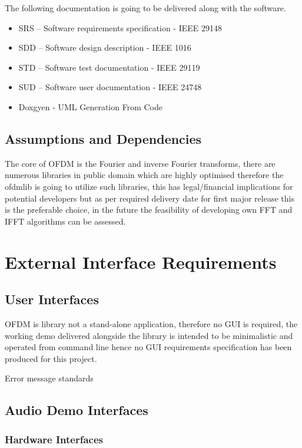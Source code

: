 \documentclass[]{report}
\begin{document}
The following documentation is going to be delivered along with the software.

\begin{itemize}
	\item SRS – Software requirements specification - IEEE 29148
	\item SDD – Software design description - IEEE 1016
	\item STD – Software test documentation - IEEE 29119
	\item SUD – Software user documentation - IEEE 24748
	\item Doxgyen - UML Generation From Code 
\end{itemize}


\subsection{Assumptions and Dependencies}

The core of OFDM is the Fourier and inverse Fourier transforms, there are numerous libraries in public domain which are highly optimised therefore the ofdmlib is going to utilize such libraries, this has legal/financial implications for potential developers but as per required delivery date for first major release this is the preferable choice, in the future the feasibility of developing own FFT and IFFT algorithms can be assessed.

\pagebreak
\section{External Interface Requirements}

\subsection{User Interfaces}

OFDM is library not a stand-alone application, therefore no GUI is required, the working demo delivered alongside the library is intended to be minimalistic and operated from command line hence no GUI requirements specification has been produced for this project. 

Error message standards

\subsection{Audio Demo Interfaces}


\subsubsection{Hardware Interfaces}
\end{document}

